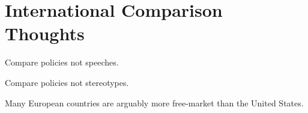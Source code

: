 \section{International Comparison Thoughts}

\thought Compare policies not speeches.

\thought Compare policies not stereotypes.

\thought Many European countries are arguably more free-market than the United
States.

